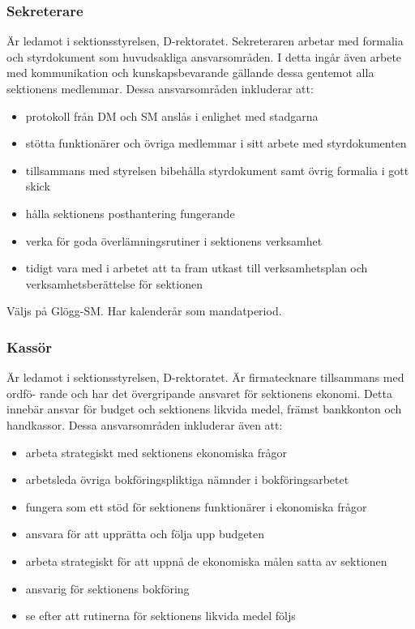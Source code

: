 \documentclass{dgovdoc}
\begin{document}
\subsubsection{Sekreterare}

Är ledamot i sektionsstyrelsen, D-rektoratet. Sekreteraren arbetar med formalia och
styrdokument som huvudsakliga ansvarsområden. I detta ingår även arbete med kommunikation
och kunskapsbevarande gällande dessa gentemot alla sektionens medlemmar.
Dessa ansvarsområden inkluderar att:
\begin{itemize}
	\item protokoll från DM och SM anslås i enlighet med stadgarna
	\item stötta funktionärer och övriga medlemmar i sitt arbete med styrdokumenten
	\item tillsammans med styrelsen bibehålla styrdokument samt övrig formalia i gott skick
	\item hålla sektionens posthantering fungerande
	\item verka för goda överlämningsrutiner i sektionens verksamhet
	\item tidigt vara med i arbetet att ta fram utkast till verksamhetsplan och verksamhetsberättelse för sektionen
\end{itemize}

Väljs på Glögg-SM. Har kalenderår som mandatperiod.

\subsubsection{Kassör}

Är ledamot i sektionsstyrelsen, D-rektoratet. Är firmatecknare tillsammans med ordfö-
rande och har det övergripande ansvaret för sektionens ekonomi. Detta innebär ansvar
för budget och sektionens likvida medel, främst bankkonton och handkassor. Dessa
ansvarsområden inkluderar även att:
\begin{itemize}
	\item arbeta strategiskt med sektionens ekonomiska frågor
	\item arbetsleda övriga bokföringspliktiga nämnder i bokföringsarbetet
	\item fungera som ett stöd för sektionens funktionärer i ekonomiska frågor
	\item ansvara för att upprätta och följa upp budgeten
	\item arbeta strategiskt för att uppnå de ekonomiska målen satta av sektionen
	\item ansvarig för sektionens bokföring
	\item se efter att rutinerna för sektionens likvida medel följs
\end{itemize}
\end{document}
